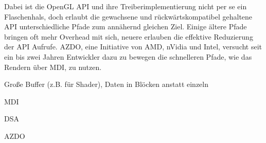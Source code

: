 Dabei ist die OpenGL API und ihre Treiberimplementierung nicht per se ein Flaschenhals, doch erlaubt die gewachsene und rückwärtskompatibel gehaltene API unterschiedliche Pfade zum annähernd gleichen Ziel. Einige ältere Pfade bringen oft mehr Overhead mit sich, neuere erlauben die effektive Reduzierung der API Aufrufe. \ac{AZDO}, eine Initiative von AMD, nVidia und Intel, versucht seit ein bis zwei Jahren Entwickler dazu zu bewegen die schnelleren Pfade, wie das Rendern über \ac{MDI}, zu nutzen.

Große Buffer (z.B. für Shader), Daten in Blöcken anstatt einzeln
\cite{Everitt2014}

\ac{MDI}

\ac{DSA}

\ac{AZDO}

\cite{gamedevnet:glnext}
